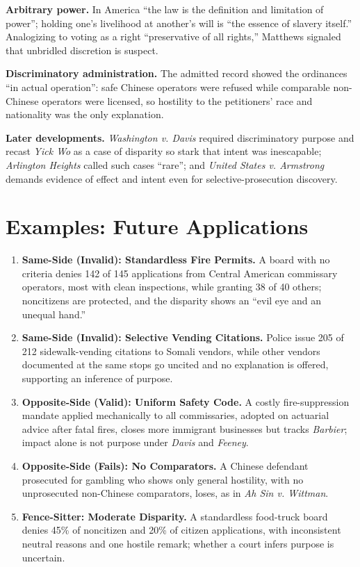 \documentclass[12pt]{article}
\begin{document}
\textbf{Arbitrary power.} In America ``the law is the definition and limitation of power''; holding one's livelihood at another's will is ``the essence of slavery itself.'' Analogizing to voting as a right ``preservative of all rights,'' Matthews signaled that unbridled discretion is suspect.

\textbf{Discriminatory administration.} The admitted record showed the ordinances ``in actual operation'': safe Chinese operators were refused while comparable non-Chinese operators were licensed, so hostility to the petitioners' race and nationality was the only explanation.

\textbf{Later developments.} \textit{Washington v. Davis} required discriminatory purpose and recast \textit{Yick Wo} as a case of disparity so stark that intent was inescapable; \textit{Arlington Heights} called such cases ``rare''; and \textit{United States v. Armstrong} demands evidence of effect and intent even for selective-prosecution discovery.

\section{Examples: Future Applications}

\begin{enumerate}
\item \textbf{Same-Side (Invalid): Standardless Fire Permits.} A board with no criteria denies 142 of 145 applications from Central American commissary operators, most with clean inspections, while granting 38 of 40 others; noncitizens are protected, and the disparity shows an ``evil eye and an unequal hand.''
\item \textbf{Same-Side (Invalid): Selective Vending Citations.} Police issue 205 of 212 sidewalk-vending citations to Somali vendors, while other vendors documented at the same stops go uncited and no explanation is offered, supporting an inference of purpose.
\item \textbf{Opposite-Side (Valid): Uniform Safety Code.} A costly fire-suppression mandate applied mechanically to all commissaries, adopted on actuarial advice after fatal fires, closes more immigrant businesses but tracks \textit{Barbier}; impact alone is not purpose under \textit{Davis} and \textit{Feeney}.
\item \textbf{Opposite-Side (Fails): No Comparators.} A Chinese defendant prosecuted for gambling who shows only general hostility, with no unprosecuted non-Chinese comparators, loses, as in \textit{Ah Sin v. Wittman}.
\item \textbf{Fence-Sitter: Moderate Disparity.} A standardless food-truck board denies 45\% of noncitizen and 20\% of citizen applications, with inconsistent neutral reasons and one hostile remark; whether a court infers purpose is uncertain.
\end{enumerate}
\end{document}
